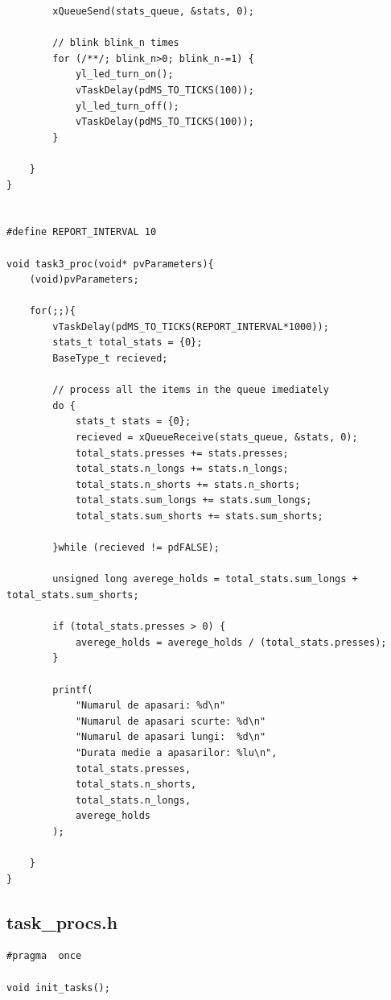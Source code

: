 \documentclass[12pt,a4paper]{article}
\begin{document}
\begin{lstlisting}
		xQueueSend(stats_queue, &stats, 0);

		// blink blink_n times
		for (/**/; blink_n>0; blink_n-=1) {
			yl_led_turn_on();
			vTaskDelay(pdMS_TO_TICKS(100));
			yl_led_turn_off();
			vTaskDelay(pdMS_TO_TICKS(100));
		}

	}
}


#define REPORT_INTERVAL 10

void task3_proc(void* pvParameters){
	(void)pvParameters;

	for(;;){
		vTaskDelay(pdMS_TO_TICKS(REPORT_INTERVAL*1000));
		stats_t total_stats = {0};
		BaseType_t recieved;

		// process all the items in the queue imediately
		do {
			stats_t stats = {0}; 
			recieved = xQueueReceive(stats_queue, &stats, 0);
			total_stats.presses += stats.presses;
			total_stats.n_longs += stats.n_longs;
			total_stats.n_shorts += stats.n_shorts;
			total_stats.sum_longs += stats.sum_longs;
			total_stats.sum_shorts += stats.sum_shorts;
		
		}while (recieved != pdFALSE);

		unsigned long averege_holds = total_stats.sum_longs + total_stats.sum_shorts;
		
		if (total_stats.presses > 0) {
			averege_holds = averege_holds / (total_stats.presses);
		}

		printf(
			"Numarul de apasari: %d\n"
			"Numarul de apasari scurte: %d\n"
			"Numarul de apasari lungi:  %d\n"
			"Durata medie a apasarilor: %lu\n",
			total_stats.presses,
			total_stats.n_shorts,
			total_stats.n_longs,
			averege_holds
		);

	}
}
\end{lstlisting}

\subsection{task\_procs.h}
\begin{lstlisting}
#pragma  once

void init_tasks();
\end{lstlisting}
\end{document}
